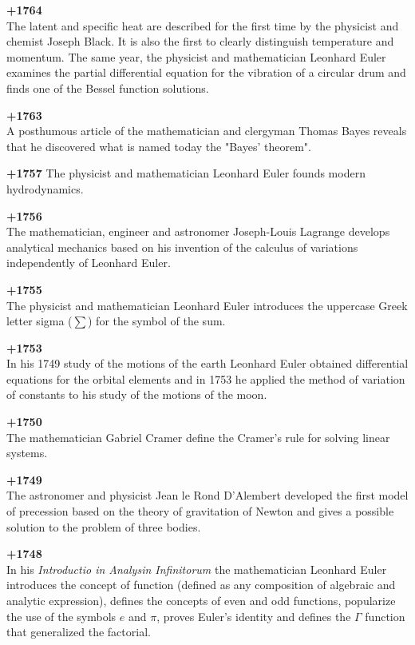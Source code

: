 \textbf{+1764}\\
The latent and specific heat are described for the first time by the physicist and chemist Joseph Black. It is also the first to clearly distinguish temperature and momentum. The same year, the physicist and mathematician Leonhard Euler examines the partial differential equation for the vibration of a circular drum and finds one of the Bessel function solutions.

\textbf{+1763}\\
A posthumous article of the mathematician and clergyman Thomas Bayes reveals that he discovered what is named today the "Bayes' theorem".

\textbf{+1757}
The physicist and mathematician Leonhard Euler founds modern hydrodynamics.

\textbf{+1756}\\
The mathematician, engineer and astronomer Joseph-Louis Lagrange develops analytical mechanics based on his invention of the calculus of variations independently of Leonhard Euler.

\textbf{+1755}\\
The physicist and mathematician Leonhard Euler introduces the uppercase Greek letter sigma ($\sum$) for the symbol of the sum.

\textbf{+1753}\\
In his 1749 study of the motions of the earth Leonhard Euler obtained differential equations for the orbital elements and in 1753 he applied the method of variation of constants to his study of the motions of the moon.

\textbf{+1750}\\
The mathematician Gabriel Cramer define the Cramer's rule for solving linear systems.

\textbf{+1749}\\
The astronomer and physicist Jean le Rond D'Alembert developed the first model of precession based on the theory of gravitation of Newton and gives a possible solution to the problem of three bodies.

\textbf{+1748}\\
In his \textit{Introductio in Analysin Infinitorum} the mathematician Leonhard Euler introduces the concept of function (defined as any composition of algebraic and analytic expression), defines the concepts of even and odd functions, popularize the use of the symbols $e$ and $\pi$, proves Euler's identity and defines the $\Gamma$ function that generalized the factorial.

